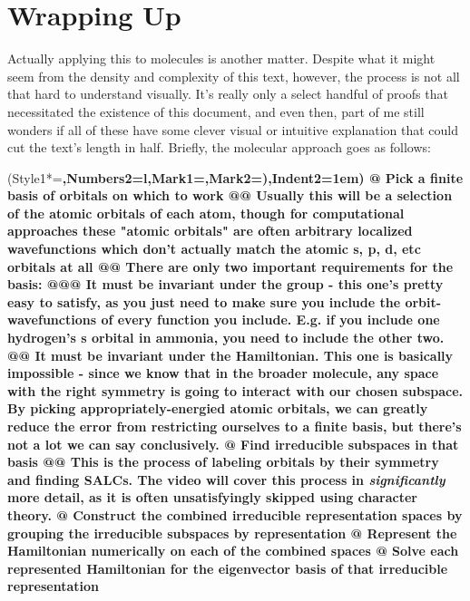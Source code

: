 \documentclass{article}
\begin{document}
\section{Wrapping Up}
Actually applying this to molecules is another matter. Despite what it might seem from the density and complexity of this text, however, the process is not all that hard to understand visually. It's really only a select handful of proofs that necessitated the existence of this document, and even then, part of me still wonders if all of these have some clever visual or intuitive explanation that could cut the text's length in half. Briefly, the molecular approach goes as follows:
\begin{easylist}
  \ListProperties(Style1*=\bfseries,Numbers2=l,Mark1={},Mark2={)},Indent2=1em)
  @ Pick a finite basis of orbitals on which to work
  @@ Usually this will be a selection of the atomic orbitals of each atom, though for computational approaches these "atomic orbitals" are often arbitrary localized wavefunctions which don't actually match the atomic s, p, d, etc orbitals at all
  @@ There are only two important requirements for the basis:
  @@@ It must be invariant under the group - this one's pretty easy to satisfy, as you just need to make sure you include the orbit-wavefunctions of every function you include. E.g. if you include one hydrogen's s orbital in ammonia, you need to include the other two.
  @@ It must be invariant under the Hamiltonian. This one is basically impossible - since we know that in the broader molecule, any space with the right symmetry is going to interact with our chosen subspace. By picking appropriately-energied atomic orbitals, we can greatly reduce the error from restricting ourselves to a finite basis, but there's not a lot we can say conclusively.
  @ Find irreducible subspaces in that basis
  @@ This is the process of labeling orbitals by their symmetry and finding SALCs. The video will cover this process in \textit{significantly} more detail, as it is often unsatisfyingly skipped using character theory.
  @ Construct the combined irreducible representation spaces by grouping the irreducible subspaces by representation
  @ Represent the Hamiltonian numerically on each of the combined spaces
  @ Solve each represented Hamiltonian for the eigenvector basis of that irreducible representation
\end{easylist}
\end{document}
